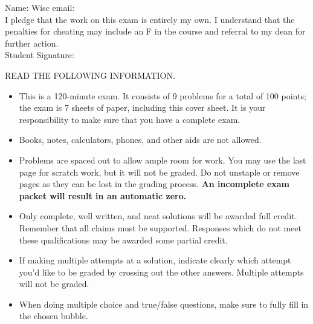 \documentclass[12pt]{extarticle}
\begin{document}
\begin{framed}
\vspace*{.2in}
Name:   Wisc email:  \vspace*{-.2in} \\
I pledge that the work on this exam is entirely my own. I understand that the penalties for cheating may include an F in the course and referral to my dean for further action.
 \vspace*{.3in} \\
Student Signature: 
\end{framed}
 \vspace{-0.2cm} 
READ THE FOLLOWING INFORMATION.
\begin{itemize}
    \item This is a 120-minute exam. It consists of 9 problems for a total of 100 points; the exam is 7 sheets of paper, including this cover sheet. It is your responsibility to make sure that you have a complete exam.\vspace{-.1in}
    \item Books, notes, calculators, phones, and other aids are not allowed.\vspace{-.1in}
    \item Problems are spaced out to allow ample room for work. You may use the last page for scratch work, but it will not be graded. Do not unstaple or remove pages as they can be lost in the grading process.  \textbf{An incomplete exam packet will result in an automatic zero.}  \vspace{-.1in}
    \item Only complete, well written, and neat solutions will be awarded full credit. Remember that all claims must be supported. Responses which do not meet these qualifications may be awarded some partial credit.\vspace{-.1in}
 \item  If making multiple attempts at a solution, indicate clearly which attempt you'd like to be graded by crossing out the other answers. Multiple attempts will not be graded.
 
 \vspace{-0.2cm} 
\item When doing multiple choice and true/false questions, make sure to fully fill in the chosen bubble.
 

\end{itemize}
\end{document}
